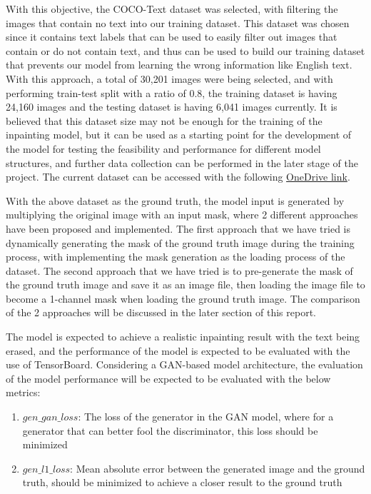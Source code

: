 \documentclass[10pt,twocolumn,letterpaper]{article}
\begin{document}
With this objective, the COCO-Text dataset was selected, with filtering the images that contain no text into our training dataset. This dataset was 
chosen since it contains text labels that can be used to easily filter out images that contain or do not contain text, and thus can be used to build our training 
dataset that prevents our model from learning the wrong information like English text. With this approach, a total of 30,201 images were being selected, and with 
performing train-test split with a ratio of 0.8, the training dataset is having 24,160 images and the testing dataset is having 6,041 images currently. It is believed
that this dataset size may not be enough for the training of the inpainting model, but it can be used as a starting point for the development of the model for testing
the feasibility and performance for different model structures, and further data collection can be performed in the later stage of the project. The current dataset can
be accessed with the following 
\href{https://hkustconnect-my.sharepoint.com/:u:/g/personal/tkleungal_connect_ust_hk/EUJ-38d8cptNgW2RK0JzHI4BfIi5mXwbIEFObTG7ji9f8g?e=LqJ1Eu}{OneDrive link}.

With the above dataset as the ground truth, the model input is generated by multiplying the original image with an input mask, where 2 different approaches have been 
proposed and implemented. The first approach that we have tried is dynamically generating the mask of the ground truth image during the training process, with implementing
the mask generation as the loading process of the dataset. The second approach that we have tried is to pre-generate the mask of the ground truth image and save it as an image
file, then loading the image file to become a 1-channel mask when loading the ground truth image. The comparison of the 2 approaches will be discussed in the later 
section of this report.

The model is expected to achieve a realistic inpainting result with the text being erased, and the performance of the model is expected to be evaluated with the
use of TensorBoard. Considering a GAN-based model architecture, the evaluation of the model performance will be expected to be evaluated with the below metrics:
\begin{enumerate}
    \item $gen\_gan\_loss$: The loss of the generator in the GAN model, where for a generator that can better fool the discriminator, this loss should be minimized
    \item $gen\_l1\_loss$: Mean absolute error between the generated image and the ground truth, should be minimized to achieve a closer result to the ground truth
\end{enumerate}
\end{document}
